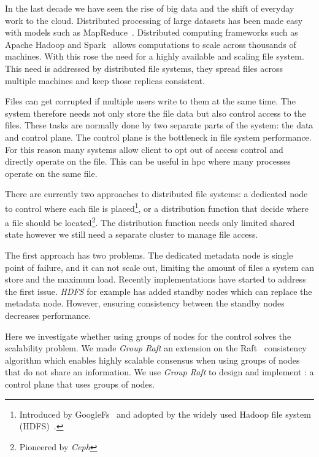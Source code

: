 In the last decade we have seen the rise of big data and the shift of everyday work to the cloud. Distributed processing of large datasets has been made easy with models such as MapReduce~\cite{mapReduce}. Distributed computing frameworks such as Apache Hadoop and Spark~\cite{spark} allows computations to scale across thousands of machines. With this rose the need for a highly available and scaling file system. This need is addressed by distributed file systems, they spread files across multiple machines and keep those replicas consistent. 

Files can get corrupted if multiple users write to them at the same time. The system therefore needs not only store the file data but also control access to the files. These tasks are normally done by two separate parts of the system: the data and control plane. The control plane is the bottleneck in file system performance. For this reason many systems allow client to opt out of access control and directly operate on the file. This can be useful in \ac{hpc} where many processes operate on the same file.

There are currently two approaches to distributed file systems: a dedicated node to control where each file is placed\footnote{Introduced by GoogleFs~\cite{GFS,GFS_interview} and adopted by the widely used Hadoop file system (HDFS)~\cite{hdfs}.}, or a distribution function that decide where a file should be located\footnote{Pioneered by \textit{Ceph}\cite{ceph}}. The distribution function needs only limited shared state however we still need a separate cluster to manage file access.

The first approach has two problems. The dedicated metadata node is single point of failure, and it can not scale out, limiting the amount of files a system can store and the maximum load. Recently implementations have started to address the first issue. \textit{HDFS} for example has added standby nodes \cite{hdfs_ha_nfs, hdfs_ha_q} which can replace the metadata node. However, ensuring consistency between the standby nodes decreases performance.

Here we investigate whether using groups of nodes for the control solves the scalability problem. We made \textit{Group Raft} an extension on the Raft~\cite{raft} consistency algorithm which enables highly scalable consensus when using groups of nodes that do not share an information. We use \textit{Group Raft} to design and implement \Name{}: a control plane that uses groups of nodes. 
%

